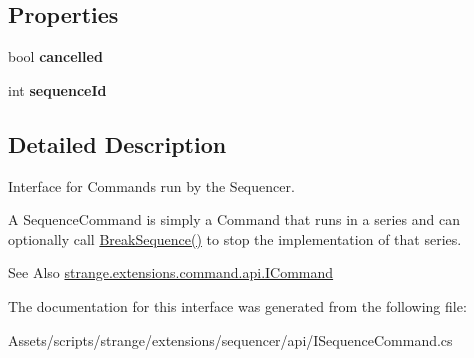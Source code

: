 \subsection*{Properties}
\begin{DoxyCompactItemize}
\item 
\hypertarget{interfacestrange_1_1extensions_1_1sequencer_1_1api_1_1_i_sequence_command_a6b86b91a38de65f5157c530204b785fc}{bool {\bfseries cancelled}}\label{interfacestrange_1_1extensions_1_1sequencer_1_1api_1_1_i_sequence_command_a6b86b91a38de65f5157c530204b785fc}

\item 
\hypertarget{interfacestrange_1_1extensions_1_1sequencer_1_1api_1_1_i_sequence_command_aa4eb2c8c442b6e46823ffcf71c9f6f2a}{int {\bfseries sequence\-Id}}\label{interfacestrange_1_1extensions_1_1sequencer_1_1api_1_1_i_sequence_command_aa4eb2c8c442b6e46823ffcf71c9f6f2a}

\end{DoxyCompactItemize}


\subsection{Detailed Description}
Interface for Commands run by the Sequencer. 

A Sequence\-Command is simply a Command that runs in a series and can optionally call {\ttfamily \hyperlink{interfacestrange_1_1extensions_1_1sequencer_1_1api_1_1_i_sequence_command_a4da87b9b59433b57f8c15007040367cb}{Break\-Sequence()}} to stop the implementation of that series.

\begin{DoxySeeAlso}{See Also}
\hyperlink{interfacestrange_1_1extensions_1_1command_1_1api_1_1_i_command}{strange.\-extensions.\-command.\-api.\-I\-Command} 
\end{DoxySeeAlso}


The documentation for this interface was generated from the following file\-:\begin{DoxyCompactItemize}
\item 
Assets/scripts/strange/extensions/sequencer/api/I\-Sequence\-Command.\-cs\end{DoxyCompactItemize}
